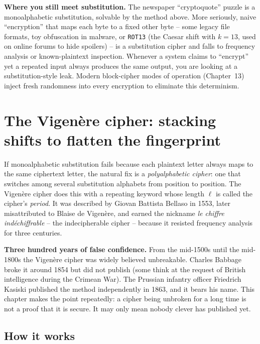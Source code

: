 \begin{applicationbox}
\textbf{Where you still meet substitution.} The newspaper ``cryptoquote'' puzzle is a
monoalphabetic substitution, solvable by the method above. More seriously, naive ``encryption''
that maps each byte to a fixed other byte -- some legacy file formats, toy obfuscation in
malware, or \texttt{ROT13} (the Caesar shift with $k=13$, used on online forums to hide
spoilers) -- is a substitution cipher and falls to frequency analysis or known-plaintext
inspection. Whenever a system claims to ``encrypt'' yet a repeated input always produces the
same output, you are looking at a substitution-style leak. Modern block-cipher modes of
operation (Chapter~13) inject fresh randomness into every encryption to eliminate this
determinism.
\end{applicationbox}

\section{The Vigen\`ere cipher: stacking shifts to flatten the fingerprint}
\label{ch02:vigenere}

If monoalphabetic substitution fails because each plaintext letter always maps to the same
ciphertext letter, the natural fix is a \emph{polyalphabetic cipher}: one that switches among
several substitution alphabets from position to position. The Vigen\`ere cipher does this with a
repeating keyword whose length $\ell$ is called the cipher's \emph{period}. It was described by
Giovan Battista Bellaso in 1553, later misattributed to Blaise de Vigen\`ere, and earned the
nickname \emph{le chiffre ind\'echiffrable} -- the indecipherable cipher -- because it resisted
frequency analysis for three centuries.

\begin{focusbox}
\textbf{Three hundred years of false confidence.} From the mid-1500s until the mid-1800s the
Vigen\`ere cipher was widely believed unbreakable. Charles Babbage broke it around 1854 but did
not publish (some think at the request of British intelligence during the Crimean War). The
Prussian infantry officer Friedrich Kasiski published the method independently in 1863, and it
bears his name. This chapter makes the point repeatedly: a cipher being unbroken for
a long time is not a proof that it is secure. It may only mean nobody clever has published yet.
\end{focusbox}

\subsection{How it works}

